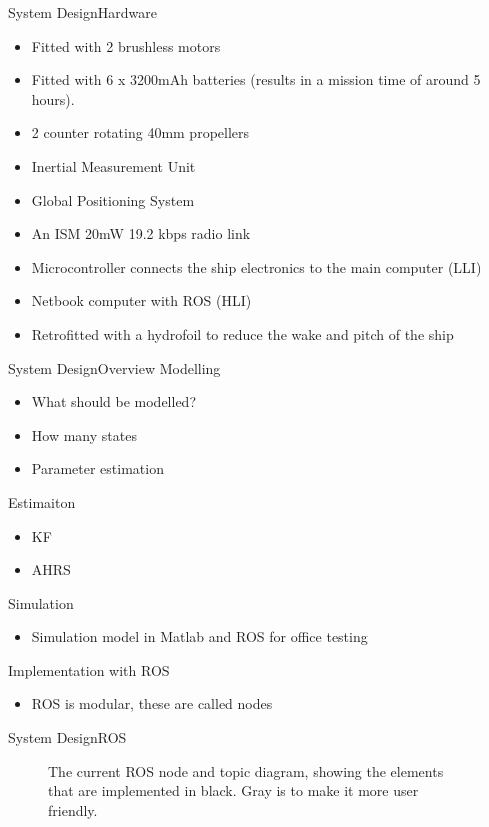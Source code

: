 \documentclass[10pt,handout]{beamer}
\begin{document}
\begin{frame}{System Design}{Hardware}
\begin{itemize}
  \item Fitted with 2 brushless motors
  \item Fitted with 6 x 3200mAh batteries (results in a mission time of around 5 hours).
  \item 2 counter rotating 40mm propellers
  \item Inertial Measurement Unit
  \item Global Positioning System
  \item An ISM 20mW 19.2 kbps radio link 
  \item Microcontroller connects the ship electronics to the main computer (LLI)
  \item Netbook computer with ROS (HLI)
  \item Retrofitted with a hydrofoil to reduce the wake and pitch of the ship
\end{itemize}
\end{frame}

\begin{frame}{System Design}{Overview}
Modelling
\begin{itemize}
\item What should be modelled?
\item How many states
\item Parameter estimation
\end{itemize}

Estimaiton
\begin{itemize}
\item KF
\item AHRS
\end{itemize}

Simulation
\begin{itemize}
\item Simulation model in Matlab and ROS for office testing
\end{itemize}

Implementation with ROS
\begin{itemize}
\item ROS is modular, these are called nodes
\end{itemize}
\end{frame}

\begin{frame}{System Design}{ROS}
  \begin{figure}
    {\tiny }
	  \caption{\scriptsize The current ROS node and topic diagram, showing the elements that are implemented in black. Gray is to make it more user friendly.}
  \end{figure}
\end{frame}
\end{document}
